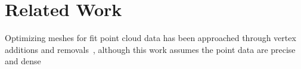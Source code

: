 \section{Related Work}
\label{sec:related}


Optimizing meshes for fit point cloud data has been approached through vertex additions and removals~\cite{hoppe:1994}, although this work assumes the point data are precise and dense


